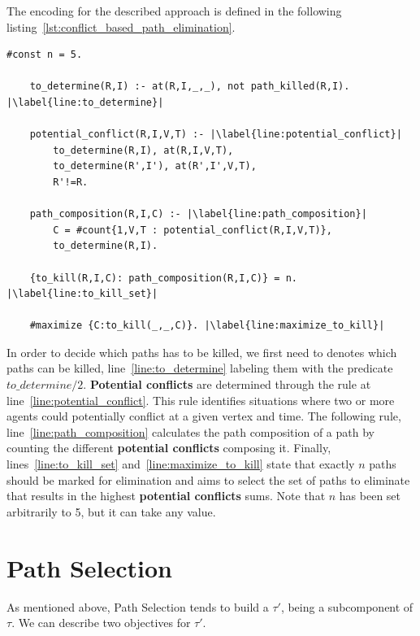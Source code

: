 The encoding for the described approach is defined in the following listing~\ref{lst:conflict_based_path_elimination}.


\begin{minipage}[H]{\linewidth}
\begin{lstlisting}[style=mystyle, caption={Conflict-based Path Elimination}, label={lst:conflict_based_path_elimination}]
    #const n = 5.

    to_determine(R,I) :- at(R,I,_,_), not path_killed(R,I). |\label{line:to_determine}|

    potential_conflict(R,I,V,T) :- |\label{line:potential_conflict}|
        to_determine(R,I), at(R,I,V,T), 
        to_determine(R',I'), at(R',I',V,T), 
        R'!=R.

    path_composition(R,I,C) :- |\label{line:path_composition}|
        C = #count{1,V,T : potential_conflict(R,I,V,T)}, 
        to_determine(R,I).

    {to_kill(R,I,C): path_composition(R,I,C)} = n. |\label{line:to_kill_set}|

    #maximize {C:to_kill(_,_,C)}. |\label{line:maximize_to_kill}|
\end{lstlisting}
\end{minipage}

In order to decide which paths has to be killed, we first need to denotes which paths can be killed, line~\ref{line:to_determine} labeling them with the predicate \(to\_determine/2\). \textbf{Potential conflicts} are determined through the rule at line~\ref{line:potential_conflict}. This rule identifies situations where two or more agents could potentially conflict at a given vertex and time. The following rule, line~\ref{line:path_composition} calculates the path composition of a path by counting the different \textbf{potential conflicts} composing it. Finally, lines~\ref{line:to_kill_set} and~\ref{line:maximize_to_kill} state that exactly \(n\) paths should be marked for elimination and aims to select the set of paths to eliminate that results in the highest \textbf{potential conflicts} sums. Note that \(n\) has been set arbitrarily to 5, but it can take any value.  

\section{Path Selection}\label{sec:ps}

As mentioned above, Path Selection tends to build a \(\tau'\), being a subcomponent of \(\tau\). We can describe two objectives for \(\tau'\).  

